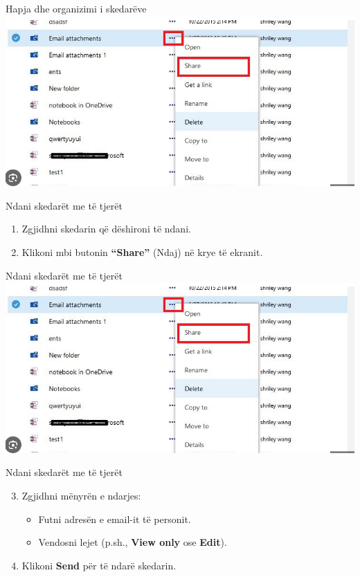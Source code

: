 \documentclass[
  ignorenonframetext,
]{beamer}
\begin{document}
\begin{frame}{Hapja dhe organizimi i skedarëve}
\label{hapja-dhe-organizimi-i-skedaruxebve-1}
\includegraphics{./images/onedrive5.png}
\end{frame}

\begin{frame}{Ndani skedarët me të tjerët}
\label{ndani-skedaruxebt-me-tuxeb-tjeruxebt}
\begin{enumerate}
\item
  Zgjidhni skedarin që dëshironi të ndani.
\item
  Klikoni mbi butonin \textbf{``Share''} (Ndaj) në krye të ekranit.
\end{enumerate}
\end{frame}

\begin{frame}{Ndani skedarët me të tjerët}
\label{ndani-skedaruxebt-me-tuxeb-tjeruxebt-1}
\includegraphics{./images/onedrive5.png}
\end{frame}

\begin{frame}{Ndani skedarët me të tjerët}
\label{ndani-skedaruxebt-me-tuxeb-tjeruxebt-2}
\begin{enumerate}
\setcounter{enumi}{2}
\item
  Zgjidhni mënyrën e ndarjes:

  \begin{itemize}
  \item
    Futni adresën e email-it të personit.
  \item
    Vendosni lejet (p.sh., \textbf{View only} ose \textbf{Edit}).
  \end{itemize}
\item
  Klikoni \textbf{Send} për të ndarë skedarin.
\end{enumerate}
\end{frame}
\end{document}
